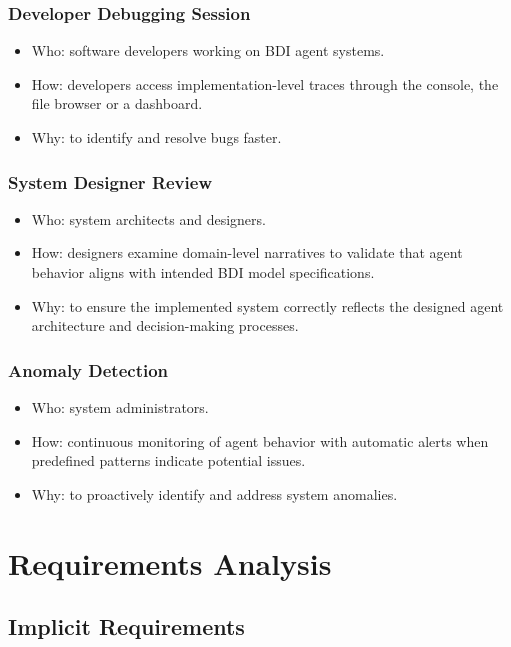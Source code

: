 \documentclass{scrartcl}
\begin{document}
\subsubsection{Developer Debugging Session}

\begin{itemize}
    \item Who: software developers working on BDI agent systems.
    \item How: developers access implementation-level traces through the console, the file browser or a dashboard.
    \item Why: to identify and resolve bugs faster.
\end{itemize}

\subsubsection{System Designer Review}

\begin{itemize}
    \item Who: system architects and designers.
    \item How: designers examine domain-level narratives to validate that agent behavior aligns with intended BDI model specifications.
    \item Why: to ensure the implemented system correctly reflects the designed agent architecture and decision-making processes.
\end{itemize}

\subsubsection{Anomaly Detection}

\begin{itemize}
    \item Who: system administrators.
    \item How: continuous monitoring of agent behavior with automatic alerts when predefined patterns indicate potential issues.
    \item Why: to proactively identify and address system anomalies.
\end{itemize}

\section{Requirements Analysis}
\subsection{Implicit Requirements}
\end{document}
